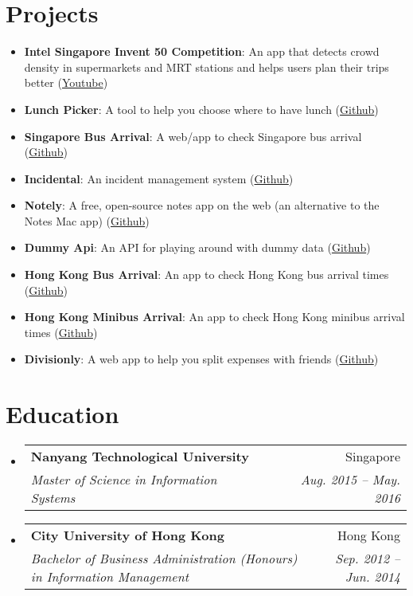 \documentclass[letterpaper,11pt]{article}
\makeatletter
\newcommand{\resumeItem}[2]{
  \item\small{
    \textbf{#1}{: #2 \vspace{-2pt}}
  }
}
\newcommand{\resumeSubheading}[4]{
  \vspace{-1pt}\item
    \begin{tabular*}{0.97\textwidth}[t]{l@{\extracolsep{\fill}}r}
      \textbf{#1} & #2 \\
      \textit{\small#3} & \textit{\small #4} \\
    \end{tabular*}\vspace{-5pt}
}
\newcommand{\resumeSubItem}[2]{\resumeItem{#1}{#2}\vspace{-4pt}}
\newcommand{\resumeSubHeadingListStart}{\begin{itemize}[leftmargin=*]}
\newcommand{\resumeSubHeadingListEnd}{\end{itemize}}
\makeatother
\begin{document}
\section{Projects}
  \resumeSubHeadingListStart
    \resumeSubItem{Intel Singapore Invent 50 Competition}
      {An app that detects crowd density in supermarkets and MRT stations and helps users plan their trips better (\href{https://www.youtube.com/watch?v=0AEbxRXz-tM&ab_channel=HardwareZoneSG}{Youtube})}
    \resumeSubItem{Lunch Picker}
      {A tool to help you choose where to have lunch (\href{https://github.com/yeukfei02?tab=repositories&q=lunch&type=source&language=&sort=stargazers}{Github})}
    \resumeSubItem{Singapore Bus Arrival}
      {A web/app to check Singapore bus arrival (\href{https://github.com/yeukfei02?tab=repositories&q=singapore-bus&type=source&language=&sort=stargazers}{Github})}
    \resumeSubItem{Incidental}
      {An incident management system (\href{https://github.com/yeukfei02?tab=repositories&q=incident&type=source&language=&sort=stargazers}{Github})}
    \resumeSubItem{Notely}
      {A free, open-source notes app on the web (an alternative to the Notes Mac app) (\href{https://github.com/yeukfei02?tab=repositories&q=notely&type=source&language=&sort=stargazers}{Github})}
    \resumeSubItem{Dummy Api}
      {An API for playing around with dummy data (\href{https://github.com/yeukfei02?tab=repositories&q=dummy&type=source&language=&sort=stargazers}{Github})}
    \resumeSubItem{Hong Kong Bus Arrival}
      {An app to check Hong Kong bus arrival times (\href{https://github.com/yeukfei02?tab=repositories&q=hong+kong+bus&type=source&language=&sort=stargazers}{Github})}
    \resumeSubItem{Hong Kong Minibus Arrival}
      {An app to check Hong Kong minibus arrival times (\href{https://github.com/yeukfei02?tab=repositories&q=hong+kong+minibus&type=source&language=&sort=stargazers}{Github})}
    \resumeSubItem{Divisionly}
      {A web app to help you split expenses with friends (\href{https://github.com/yeukfei02?tab=repositories&q=division&type=source&language=&sort=stargazers}{Github})}
  \resumeSubHeadingListEnd


\section{Education}
  \resumeSubHeadingListStart
    \resumeSubheading
      {Nanyang Technological University}{Singapore}
      {Master of Science in Information Systems}{Aug. 2015 -- May. 2016}
    \resumeSubheading
      {City University of Hong Kong}{Hong Kong}
      {Bachelor of Business Administration (Honours) in Information Management}{Sep. 2012 -- Jun. 2014}
  \resumeSubHeadingListEnd


\end{document}

